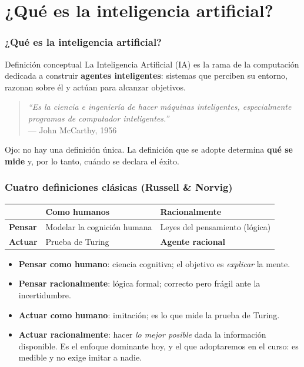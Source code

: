\documentclass[aspectratio=169, 10pt]{beamer}
\begin{document}
\section{¿Qué es la inteligencia artificial?}

\begin{frame}
\frametitle{¿Qué es la inteligencia artificial?}
\begin{block}{Definición conceptual}
La Inteligencia Artificial (IA) es la rama de la computaci\'on dedicada a construir \textbf{agentes inteligentes}: sistemas que perciben su entorno, razonan sobre \'el y act\'uan para alcanzar objetivos.
\end{block}
\pause
\begin{quote}
\emph{``Es la ciencia e ingenier\'ia de hacer m\'aquinas inteligentes, especialmente programas de computador inteligentes.''}\\
\hfill --- John McCarthy, 1956
\end{quote}
\pause
\vspace{0.3em}
\footnotesize
Ojo: no hay una definici\'on \'unica. La definici\'on que se adopte determina \textbf{qu\'e se mide} y, por lo tanto, cu\'ando se declara el \'exito.
\end{frame}

\begin{frame}
\frametitle{Cuatro definiciones clásicas (Russell \& Norvig)}
\begin{center}
\begin{tabular}{lll}
\toprule
 & \textbf{Como humanos} & \textbf{Racionalmente} \\
\midrule
\textbf{Pensar} & Modelar la cognici\'on humana & Leyes del pensamiento (l\'ogica) \\
\addlinespace
\textbf{Actuar}  & Prueba de Turing & \textbf{Agente racional} \\
\bottomrule
\end{tabular}
\end{center}
\vspace{0.9em}
\begin{itemize}
	\item \textbf{Pensar como humano}: ciencia cognitiva; el objetivo es \emph{explicar} la mente.
	\pause
	\item \textbf{Pensar racionalmente}: l\'ogica formal; correcto pero fr\'agil ante la incertidumbre.
	\pause
	\item \textbf{Actuar como humano}: imitaci\'on; es lo que mide la prueba de Turing.
	\pause
	\item \textbf{Actuar racionalmente}: hacer \emph{lo mejor posible} dada la informaci\'on disponible. Es el enfoque dominante hoy, y el que adoptaremos en el curso: es medible y no exige imitar a nadie.
\end{itemize}
\end{frame}
\end{document}
